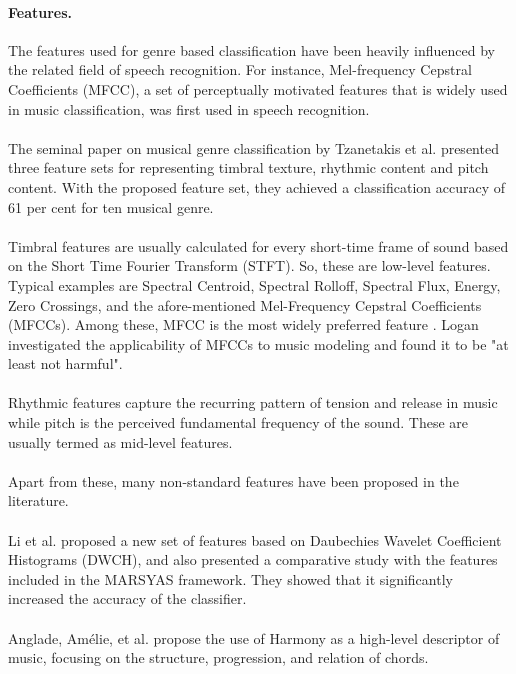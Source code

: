 \paragraph{Features.}
The features used for genre based classification have been heavily influenced by the related field of speech recognition. 
For instance, Mel-frequency Cepstral Coefficients (MFCC), a set of perceptually motivated features that is widely used in music classification, was first used in speech recognition.\\
\\
The seminal paper on musical genre classification by Tzanetakis et al. \cite{Tzanetakis2002} presented three feature sets for representing timbral texture, rhythmic content and pitch content. 
With the proposed feature set, they achieved a classification accuracy of 61 per cent for ten musical genre.\\
\\
Timbral features are usually calculated for every short-time frame of sound based on the Short Time Fourier Transform (STFT). 
So, these are low-level features. 
Typical examples are Spectral Centroid, Spectral Rolloff, Spectral Flux, Energy, Zero Crossings, and the afore-mentioned Mel-Frequency Cepstral Coefficients (MFCCs).
Among these, MFCC is the most widely preferred feature \cite{Lippens2004}\cite{Kour2015}. Logan \cite{Logan2000} investigated the applicability of MFCCs to music modeling and found it to be "at least not harmful".\\
\\
Rhythmic features capture the recurring pattern of tension and release in music while pitch is the perceived fundamental frequency of the sound. 
These are usually termed as mid-level features.\\
\\
Apart from these, many non-standard features have been proposed in the literature. \\
\\
Li et al.\cite{Li2003} proposed a new set of features based on Daubechies Wavelet Coefficient Histograms (DWCH), and also presented a comparative study with the features included in the MARSYAS framework.
They showed that it significantly increased the accuracy of the classifier.\\
\\
Anglade, Amélie, et al.\cite{Anglade2010} propose the use of Harmony as a high-level descriptor of music, focusing on the structure, progression, and relation of chords.\\
\\

